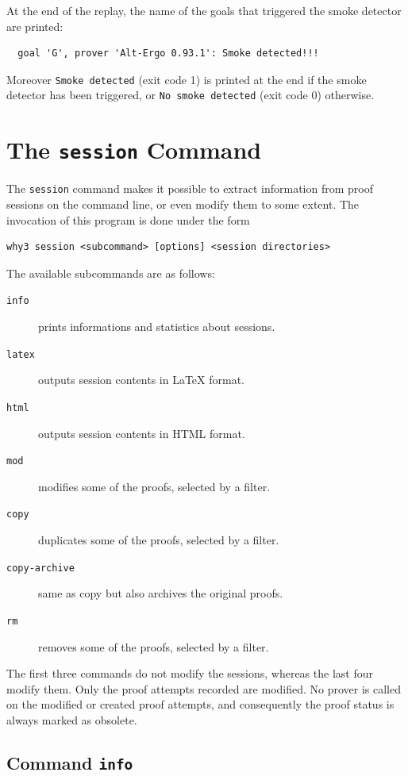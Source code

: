 At the end of the replay, the name of the goals that triggered the
smoke detector are printed:
\begin{verbatim}
  goal 'G', prover 'Alt-Ergo 0.93.1': Smoke detected!!!
\end{verbatim}
Moreover \texttt{Smoke detected} (exit code 1) is printed at the end
if the smoke detector has been triggered, or \texttt{No smoke
  detected} (exit code 0) otherwise.



\section{The \texttt{session} Command}
\label{sec:why3session}

The \texttt{session} command makes it possible to extract information from
proof sessions on the command line, or even modify them to some
extent. The invocation of this program is done under the form
\begin{verbatim}
why3 session <subcommand> [options] <session directories>
\end{verbatim}
The available subcommands are as follows:
\begin{description}
\item[\texttt{info}] prints informations and statistics about sessions.
\item[\texttt{latex}] outputs session contents in LaTeX format.
\item[\texttt{html}] outputs session contents in HTML format.
\item[\texttt{mod}] modifies some of the proofs, selected by a filter.
\item[\texttt{copy}] duplicates some of the proofs, selected by a filter.
\item[\texttt{copy-archive}]  same as copy but also archives the
  original proofs.
\item[\texttt{rm}] removes some of the proofs, selected by a filter.
\end{description}

The first three commands do not modify the sessions, whereas the last
four modify them. Only the proof attempts recorded are modified. No
prover is called on the modified or created proof attempts, and
consequently the proof status is always marked as obsolete.

\subsection{Command \texttt{info}}

